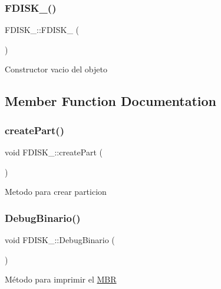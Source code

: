 \subsubsection{\texorpdfstring{F\+D\+I\+S\+K\+\_\+()}{FDISK\_()}}
{\footnotesize\ttfamily F\+D\+I\+S\+K\+\_\+\+::\+F\+D\+I\+S\+K\+\_\+ (\begin{DoxyParamCaption}{ }\end{DoxyParamCaption})\hspace{0.3cm}{\ttfamily [inline]}}

Constructor vacio del objeto 

\subsection{Member Function Documentation}
\mbox{\label{classFDISK___a1d030793b942f70d9cde1d7bd7a2bb36}} 
\subsubsection{\texorpdfstring{create\+Part()}{createPart()}}
{\footnotesize\ttfamily void F\+D\+I\+S\+K\+\_\+\+::create\+Part (\begin{DoxyParamCaption}{ }\end{DoxyParamCaption})\hspace{0.3cm}{\ttfamily [inline]}}

Metodo para crear particion \mbox{\label{classFDISK___ac3a1b362131afe438a0cfcd55d24fb24}} 
\subsubsection{\texorpdfstring{Debug\+Binario()}{DebugBinario()}}
{\footnotesize\ttfamily void F\+D\+I\+S\+K\+\_\+\+::\+Debug\+Binario (\begin{DoxyParamCaption}{ }\end{DoxyParamCaption})\hspace{0.3cm}{\ttfamily [inline]}}

Método para imprimir el \hyperlink{structMBR}{M\+BR} \mbox{\label{classFDISK___ac066192fc5d768882f553a802e34a1fd}} 
